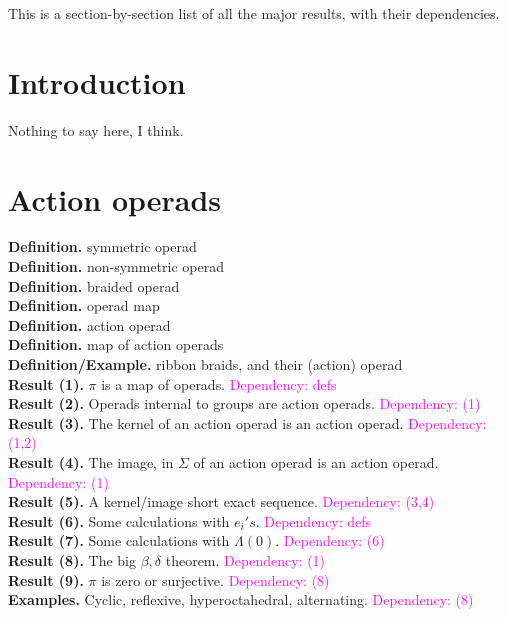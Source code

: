 \documentclass{amsart}
\begin{document}
This is a section-by-section list of all the major results, with their dependencies.

\section{Introduction}

Nothing to say here, I think.

\section{Action operads}

\textbf{Definition.} symmetric operad
\\ \textbf{Definition.} non-symmetric operad
\\ \textbf{Definition.} braided operad
\\ \textbf{Definition.} operad map
\\ \textbf{Definition.} action operad
\\ \textbf{Definition.} map of action operads
\\ \textbf{Definition/Example.} ribbon braids, and their (action) operad
\\ \textbf{Result (1).} $\pi$ is a map of operads. \textcolor{magenta}{Dependency: defs}
\\ \textbf{Result (2).} Operads internal to groups are action operads. \textcolor{magenta}{Dependency: (1)}
\\ \textbf{Result (3).} The kernel of an action operad is an action operad. \textcolor{magenta}{Dependency: (1,2)}
\\ \textbf{Result (4).} The image, in $\Sigma$ of an action operad is an action operad. \textcolor{magenta}{Dependency: (1)}
\\ \textbf{Result (5).} A kernel/image short exact sequence. \textcolor{magenta}{Dependency: (3,4)}
\\ \textbf{Result (6).} Some calculations with $e_i's$. \textcolor{magenta}{Dependency: defs}
\\ \textbf{Result (7).} Some calculations with $\Lambda(0)$. \textcolor{magenta}{Dependency: (6)}
\\ \textbf{Result (8).} The big $\beta, \delta$ theorem. \textcolor{magenta}{Dependency: (1)}
\\ \textbf{Result (9).} $\pi$ is zero or surjective. \textcolor{magenta}{Dependency: (8)}
\\ \textbf{Examples.} Cyclic, reflexive, hyperoctahedral, alternating. \textcolor{magenta}{Dependency: (8)}
\end{document}
